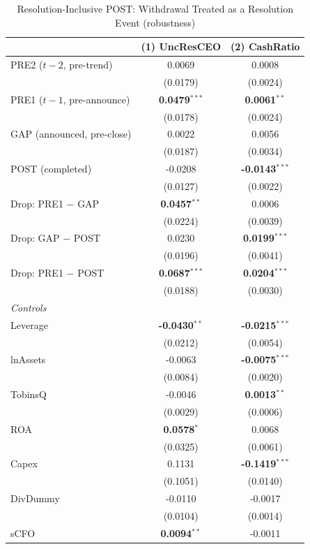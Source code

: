 \begin{table}[htbp]
\centering
\caption{Resolution-Inclusive POST: Withdrawal Treated as a Resolution Event (robustness)}
\label{tab:empire_drop_resolution}
\scriptsize
\begin{tabular}{lcc}
\toprule
 & (1) UncResCEO & (2) CashRatio \\
\midrule
PRE2 ($t{-}2$, pre-trend) & 0.0069 & 0.0008 \\
 & (0.0179) & (0.0024) \\
PRE1 ($t{-}1$, pre-announce) & \textbf{0.0479}$^{***}$ & \textbf{0.0061}$^{**}$ \\
 & (0.0178) & (0.0024) \\
GAP (announced, pre-close) & 0.0022 & 0.0056 \\
 & (0.0187) & (0.0034) \\
POST (completed) & -0.0208 & \textbf{-0.0143}$^{***}$ \\
 & (0.0127) & (0.0022) \\
\midrule
Drop: PRE1 $-$ GAP & \textbf{0.0457}$^{**}$ & 0.0006 \\
 & (0.0224) & (0.0039) \\
Drop: GAP $-$ POST & 0.0230 & \textbf{0.0199}$^{***}$ \\
 & (0.0196) & (0.0041) \\
Drop: PRE1 $-$ POST & \textbf{0.0687}$^{***}$ & \textbf{0.0204}$^{***}$ \\
 & (0.0188) & (0.0030) \\
\midrule
\multicolumn{3}{l}{\textit{Controls}} \\
Leverage & \textbf{-0.0430}$^{**}$ & \textbf{-0.0215}$^{***}$ \\
 & (0.0212) & (0.0054) \\
lnAssets & -0.0063 & \textbf{-0.0075}$^{***}$ \\
 & (0.0084) & (0.0020) \\
TobinsQ & -0.0046 & \textbf{0.0013}$^{**}$ \\
 & (0.0029) & (0.0006) \\
ROA & \textbf{0.0578}$^{*}$ & 0.0068 \\
 & (0.0325) & (0.0061) \\
Capex & 0.1131 & \textbf{-0.1419}$^{***}$ \\
 & (0.1051) & (0.0140) \\
DivDummy & -0.0110 & -0.0017 \\
 & (0.0104) & (0.0014) \\
sCFO & \textbf{0.0094}$^{**}$ & -0.0011 \\

\end{tabular}
\end{table}
